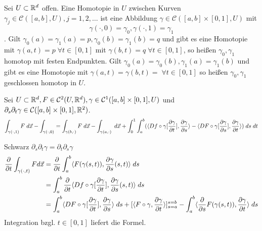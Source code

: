 \documentclass[../ana2.tex]{subfiles}
\begin{document}
\begin{defi}
    Sei \(U \subset \R^d\) offen. Eine Homotopie in \(U\)
    zwischen Kurven \(\gamma_j \in \mathcal{C}([a,b], U), j=1,2,\ldots\)
    ist eine Abbildung \(\gamma \in \mathcal{C}([a,b]\times [0,1], U)\) mit
    \[ \gamma(\cdot, 0) = \gamma_0, \gamma(\cdot, 1) = \gamma_1 \].
    Gilt \( \gamma_0(a) = \gamma_1(a) = p, 
    \gamma_0(b) = \gamma_1(b) = q \) und gibt es eine Homotopie mit    
    \(\gamma(a,t) = p \; \forall t \in [0,1]\) mit 
    \(\gamma(b,t) = q \; \forall t \in [0,1]\), so heißen \(\gamma_0, \gamma_1\)
    homotop mit festen Endpunkten. Gilt \(\gamma_0(a) = \gamma_0(b), \gamma_1(a) = \gamma_1(b)\)
    und gibt es eine Homotopie mit \(\gamma(a, t) = \gamma(b,t) = \; \forall t \in [0,1]\)
    so heißen \(\gamma_0, \gamma_1\) geschlossen homotop in \(U\).
\end{defi}
\begin{lem}
    Sei \( U \subset \R^d, F \in \mathcal{C}^2(U, \R^d), 
    \gamma \in \mathcal{C}^1([a,b] \times [0,1], U) \) und 
    \( \partial_s \partial_t \gamma \in \mathcal{C}([a,b] \times [0,1], \R^2) \).
    \[ \int_{\gamma(\cdot, 1)} F \; d \vec{x}
    - \int_{\gamma(\cdot, 0)} 
    = \int_{\gamma(b, \cdot)} F \; d \vec{x} - \int_{\gamma(a, \cdot)} \; d\vec{x} 
    + \int_0^1 \int_a^b (\scalarprod{Df \circ \gamma[\ddxpartialboth{\gamma}{t}] }{ \ddxpartialboth{\gamma}{s} } 
    - \scalarprod{ DF \circ \gamma[\ddxpartialboth{\gamma}{s}] }{ \ddxpartialboth{\gamma}{t} } ) \; ds\; dt \]
\end{lem}
\begin{bew}
    Schwarz \( \partial_s \partial_t \gamma = \partial_t \partial_s \gamma \)
    \begin{align*}
        \ddxpartial{t} \int_{\gamma(\cdot, t)} F d\vec{x} 
        &= \ddxpartial{t} \integralx{\scalarprod{F(\gamma(s,t))}{\ddxpartialboth{\gamma}{s}(s,t)}}{a}{b}{s}\\
        &= \int_a^b \ddxpartial{t} \scalarprod{Df \circ \gamma[\ddxpartialboth{\gamma}{t}] }{ \ddxpartialboth{\gamma}{s}(s,t) } \; ds\\
        &= \int_a^b \scalarprod{DF \circ \gamma [\ddxpartialboth{\gamma}{t}]}{\ddxpartialboth{\gamma}{s}} \; ds + [\scalarprod{F \circ \gamma}{\ddxpartialboth{\gamma}{t}}]_{s=a}^{s=b} 
        - \int_a^b \scalarprod{ \ddxpartial{s} F(\gamma(s,t))}{\ddxpartialboth{\gamma}{t} } \; ds
    \end{align*}
    Integration bzgl. \(t \in [0,1]\) liefert die Formel.
\end{bew}
\end{document}
